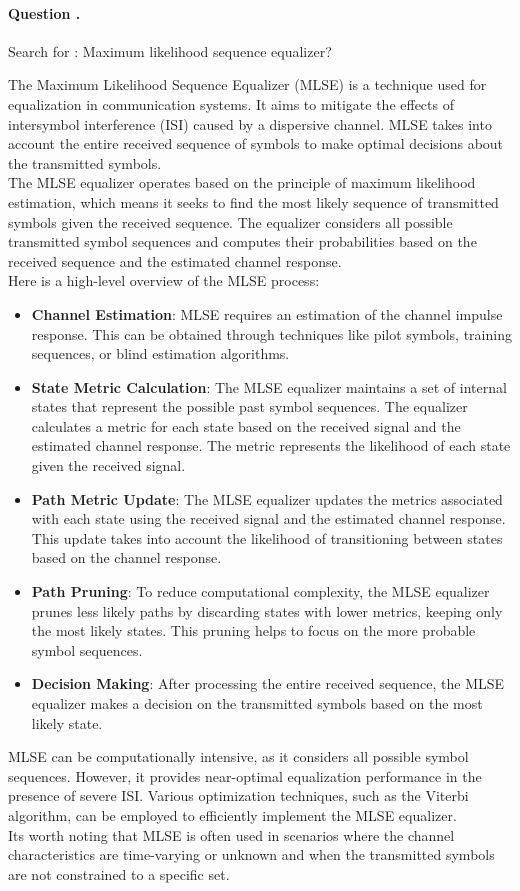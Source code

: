 \documentclass[14pt,a4paper]{report}
\newcounter{question}
\newcommand*\question{%
\stepcounter{question}%
\paragraph{Question \thesection.\thequestion}}
\begin{document}
\question
{
    Search for : Maximum likelihood sequence equalizer?
}
\begin{answer_box*}
    The Maximum Likelihood Sequence Equalizer (MLSE) is a technique used for equalization in communication systems. It aims to mitigate the effects of intersymbol interference (ISI) caused by a dispersive channel. MLSE takes into account the entire received sequence of symbols to make optimal decisions about the transmitted symbols.\\
    The MLSE equalizer operates based on the principle of maximum likelihood estimation, which means it seeks to find the most likely sequence of transmitted symbols given the received sequence. The equalizer considers all possible transmitted symbol sequences and computes their probabilities based on the received sequence and the estimated channel response.\\
    Here is a high-level overview of the MLSE process:

\begin{itemize}
    \item \textbf{Channel Estimation}: MLSE requires an estimation of the channel impulse response. This can be obtained through techniques like pilot symbols, training sequences, or blind estimation algorithms.
    \item \textbf{State Metric Calculation}: The MLSE equalizer maintains a set of internal states that represent the possible past symbol sequences. The equalizer calculates a metric for each state based on the received signal and the estimated channel response. The metric represents the likelihood of each state given the received signal.
    \item \textbf{Path Metric Update}: The MLSE equalizer updates the metrics associated with each state using the received signal and the estimated channel response. This update takes into account the likelihood of transitioning between states based on the channel response.
    \item \textbf{Path Pruning}: To reduce computational complexity, the MLSE equalizer prunes less likely paths by discarding states with lower metrics, keeping only the most likely states. This pruning helps to focus on the more probable symbol sequences.
    \item \textbf{Decision Making}: After processing the entire received sequence, the MLSE equalizer makes a decision on the transmitted symbols based on the most likely state.    
\end{itemize}
    MLSE can be computationally intensive, as it considers all possible symbol sequences. However, it provides near-optimal equalization performance in the presence of severe ISI. Various optimization techniques, such as the Viterbi algorithm, can be employed to efficiently implement the MLSE equalizer.\\
    Its worth noting that MLSE is often used in scenarios where the channel characteristics are time-varying or unknown and when the transmitted symbols are not constrained to a specific set.
\end{answer_box*}
\end{document}
